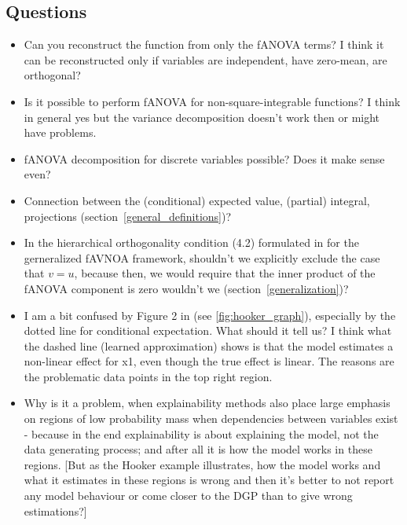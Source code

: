 \subsection*{Questions}
\begin{itemize}
    \item Can you reconstruct the function from only the fANOVA terms? I think it can be reconstructed only if variables are independent, have zero-mean, are orthogonal?
    \item Is it possible to perform fANOVA for non-square-integrable functions? I think in general yes but the variance decomposition doesn't work then or might have problems.
    \item fANOVA decomposition for discrete variables possible? Does it make sense even?
    \item Connection between the (conditional) expected value, (partial) integral, projections (section~\ref{general_definitions})?
    \item In the hierarchical orthogonality condition (4.2) formulated in \cite{hooker2007} for the gerneralized fAVNOA framework, shouldn't we explicitly exclude the case that $v = u$, because then, we would require that the inner product of the fANOVA component is zero wouldn't we (section~\ref{generalization})?
    \item I am a bit confused by Figure 2 in \cite{hooker2007} (see \autoref{fig:hooker_graph}), especially by the dotted line for conditional expectation. What should it tell us? I think what the dashed line (learned approximation) shows is that the model estimates a non-linear effect for x1, even though the true effect is linear. The reasons are the problematic data points in the top right region.
    \item Why is it a problem, when explainability methods also place large emphasis on regions of low probability mass when dependencies between variables exist - because in the end explainability is about explaining the model, not the data generating process; and after all it is how the model works in these regions. [But as the Hooker example illustrates, how the model works and what it estimates in these regions is wrong and then it's better to not report any model behaviour or come closer to the DGP than to give wrong estimations?]

\end{itemize}
